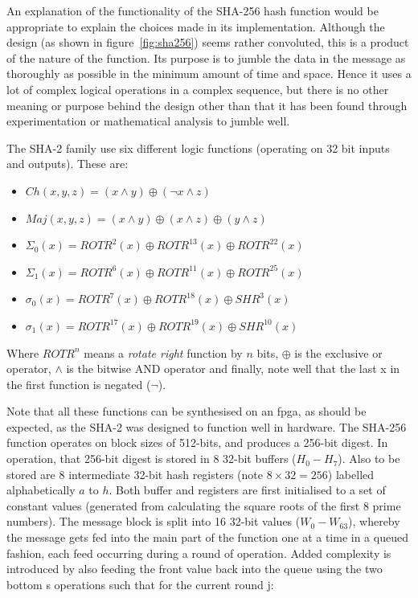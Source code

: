 An explanation of the functionality of the SHA-256 hash function would be
appropriate to explain the choices made in its implementation.
Although the design (as shown in figure~\ref{fig:sha256})
seems rather convoluted, this is a product of the nature of
the function. Its purpose is to jumble the data in the message as thoroughly as
possible in the minimum amount of time and space.
Hence it uses a lot of complex logical operations in a complex sequence, but
there is no other meaning or purpose behind the design other than that it has
been found through experimentation or mathematical analysis to jumble well.

The SHA-2 family use six different logic functions (operating on 32 bit inputs
and outputs). These are:

\begin{itemize}
	\item $Ch(x, y, z)  = (x \wedge y) \oplus (\neg x \wedge z)$
	\item $Maj(x, y, z) = (x \wedge y) \oplus (x \wedge z) \oplus (y \wedge z)$
	\item $\Sigma_{0}(x) = ROTR^{ 2}(x) \oplus ROTR^{13}(x) \oplus ROTR^{22}(x)$
	\item $\Sigma_{1}(x) = ROTR^{ 6}(x) \oplus ROTR^{11}(x) \oplus ROTR^{25}(x)$
	\item $\sigma_{0}(x) = ROTR^{ 7}(x) \oplus ROTR^{18}(x) \oplus  SHR^{ 3}(x)$
	\item $\sigma_{1}(x) = ROTR^{17}(x) \oplus ROTR^{19}(x) \oplus  SHR^{10}(x)$
\end{itemize}

Where $ROTR^{n}$ means a \emph{rotate right} function by $n$ bits, $\oplus$ is
the exclusive or operator, $\wedge$ is the bitwise AND operator and finally,
note well that the last x in the first function is negated ($\neg$).

Note that all these functions can be synthesised on an \gls{fpga}, as should be
expected, as the SHA-2 was designed to function well in hardware.
The SHA-256 function operates on block sizes of 512-bits, and produces a
256-bit digest.
In operation, that 256-bit digest is stored in 8 32-bit buffers
($H_{0} - H_{7}$).
Also to be stored are 8 intermediate 32-bit hash registers
(note $8 \times 32 = 256$) labelled alphabetically $a$ to $h$.
Both buffer and registers are first initialised to a set of constant values
(generated from calculating the square roots of the first 8 prime numbers).
The message block is split into 16 32-bit values ($W_{0} - W_{63}$), whereby the
message gets fed into the main part of the function one at a time in a queued
fashion, each feed occurring during a round of operation.
Added complexity is introduced by also feeding the front value back into
the queue using the two bottom s operations such that for the current round
j:

